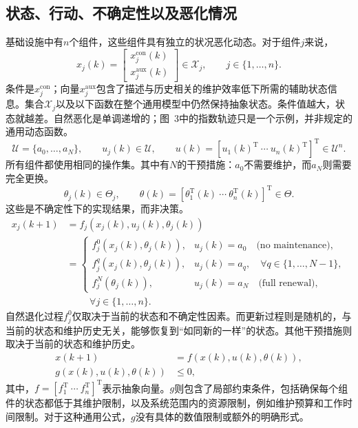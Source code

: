 \documentclass{article}
\begin{document}
\subsection*{状态、行动、不确定性以及恶化情况}
基础设施中有$n$个组件，这些组件具有独立的状况恶化动态。对于组件$j$来说，
\[
x_j(k)=\begin{bmatrix}x_j^{\mathrm{con}}(k)\\x_j^{\mathrm{aux}}(k)\end{bmatrix}\in\mathcal X_j,
\qquad j\in\{1,\ldots,n\}.
\]
条件是$x_j^{\mathrm{con}}$；向量$x_j^{\mathrm{aux}}$包含了描述与历史相关的维护效率低下所需的辅助状态信息。集合$\mathcal X_j$以及以下函数在整个通用模型中仍然保持抽象状态。条件值越大，状态就越差。自然恶化是单调递增的；图~3中的指数轨迹只是一个示例，并非规定的通用动态函数。
\[
\mathcal U=\{a_0,\ldots,a_N\},\qquad u_j(k)\in\mathcal U,
\qquad u(k)=[u_1(k)^{\mathrm T}\ \cdots\ u_n(k)^{\mathrm T}]^{\mathrm T}\in\mathcal U^n.
\]
所有组件都使用相同的操作集。其中有$N$的干预措施：$a_0$不需要维护，而$a_N$则需要完全更换。
\[
\theta_j(k)\in\Theta_j,\qquad
\theta(k)=[\theta_1^{\mathrm T}(k)\ \cdots\ \theta_n^{\mathrm T}(k)]^{\mathrm T}\in\Theta.
\]
这些是不确定性下的实现结果，而非决策。
\begin{equation}
\begin{aligned}
x_j(k+1)&=f_j(x_j(k),u_j(k),\theta_j(k))\\
&=\begin{cases}
f_j^0(x_j(k),\theta_j(k)),&u_j(k)=a_0\quad\text{(no maintenance)},\\
f_j^q(x_j(k),\theta_j(k)),&u_j(k)=a_q,\quad\forall q\in\{1,\ldots,N-1\},\\
f_j^N(\theta_j(k)),&u_j(k)=a_N\quad\text{(full renewal)},
\end{cases}\\[-2pt]
&\hspace{1cm}\forall j\in\{1,\ldots,n\}.
\end{aligned}\tag{1}
\end{equation}
自然退化过程$f_j^0$仅取决于当前的状态和不确定性因素。而更新过程则是随机的，与当前的状态和维护历史无关，能够恢复到“如同新的一样”的状态。其他干预措施则取决于当前的状态和维护历史。
\begin{align}
x(k+1)&=f(x(k),u(k),\theta(k)), \tag{2}\\
g(x(k),u(k),\theta(k))&\leq0, \tag{3}
\end{align}
其中，$f=[f_1^{\mathrm T}\ \cdots\ f_n^{\mathrm T}]^{\mathrm T}$表示抽象向量。$g$则包含了局部约束条件，包括确保每个组件的状态都低于其维护限制，以及系统范围内的资源限制，例如维护预算和工作时间限制。对于这种通用公式，$g$没有具体的数值限制或额外的明确形式。
\end{document}
